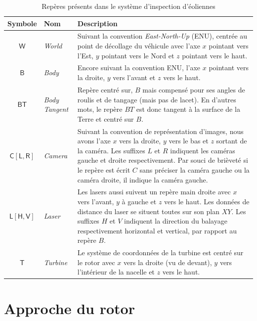 \begin{table}[htp]
  \centering
  \setlength{\tabcolsep}{12pt}
  \begin{tabular}[htp]{|c|l|p{10cm}|}
    \hline
    Symbole & Nom                   & Description\\\hline
    $\mathsf{W}$     &  \textit{World}       & Suivant la convention \textit{East-North-Up} (ENU), centrée au point de décollage du véhicule avec l'axe $x$ pointant vers l'Est, $y$ pointant vers le Nord et $z$ pointant vers le haut.\\ \hline
    $\mathsf{B}$     &  \textit{Body}        & Encore suivant la convention ENU, l'axe $x$ pointant vers la droite, $y$ vers l'avant et $z$ vers le haut. \\ \hline
    $\mathsf{BT}$  &  \textit{Body Tangent} & Repère centré sur, $B$ mais compensé pour ses angles de roulis et de tangage (mais pas de lacet). En d'autres mots, le repère ${BT}$ est donc tangent à la surface de la Terre et centré sur $B$. \\ \hline
    $\mathsf{C[L,R]}$ & \textit{Camera} & Suivant la convention de représentation d'images, nous avons l'axe $x$ vers la droite, $y$ vers le bas et $z$ sortant de la caméra. Les suffixes $L$ et $R$ indiquent les caméras gauche et droite respectivement. Par souci de brièveté si le repère est écrit $C$ sans préciser la caméra gauche ou la caméra droite, il indique la caméra gauche.   \\ \hline
    $\mathsf{L[H,V]}$ & \textit{Laser}& Les lasers aussi suivent un repère main droite avec $x$ vers l'avant, $y$ à gauche et $z$ vers le haut. Les données de distance du laser se situent toutes sur son plan $XY$. Les suffixes $H$ et $V$ indiquent la direction du balayage respectivement horizontal et vertical, par rapport au repère $B$. \\ \hline
    $\mathsf{T}$ & \textit{Turbine} & Le système de coordonnées de la turbine est centré sur le rotor avec $x$ vers la droite (vu de devant), $y$ vers l'intérieur de la nacelle et $z$ vers le haut. \\ \hline
  \end{tabular}
  \setlength{\tabcolsep}{6pt}
  \caption{Repères présents dans le système d'inspection d'éoliennes}
  \label{table:coordinate_frames}
\end{table}

\section{Approche du rotor}

